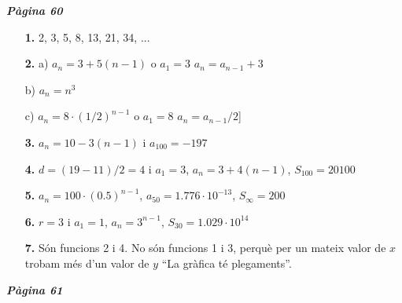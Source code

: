 \documentclass[a4paper, pdf, twoside]{book}
\begin{document}
\begin{multicols}{2}

{\textbf{\em Pàgina 60}} \hrulefill
\begin{enumerate}
\vspace{0.25cm}
\item[\fontfamily{phv}\selectfont\color{blue}\textbf{1. }]  \scalebox{0.6}{\simbolclau } 
2, 3, 5, 8, 13, 21, 34, ...
 \end{enumerate}
\begin{enumerate}
\vspace{0.25cm}
\item[\fontfamily{phv}\selectfont\color{blue}\textbf{2. }]  \scalebox{0.6}{\simbolclau } 
a) $a_n=3+5(n-1)$ o $a_1=3$ $a_n=a_{n-1}+3$ \par b) $a_n=n^3$ \par c) $a_n=8\cdot (1/2)^{n-1}$ o $a_1=8$ $a_n=a_{n-1}/2$]
\vspace{0.25cm}
\item[\fontfamily{phv}\selectfont\color{blue}\textbf{3. }]  \scalebox{0.6}{\simbolclau } 
$a_n=10-3(n-1)$ i $a_{100}=-197$
\vspace{0.25cm}
\item[\fontfamily{phv}\selectfont\color{blue}\textbf{4. }]  \scalebox{0.6}{\simbolclau } 
$d=(19-11)/2=4$ i $a_1=3$, \linebreak $a_n=3+4(n-1)$, $S_{100}=20100$
\vspace{0.25cm}
\item[\fontfamily{phv}\selectfont\color{blue}\textbf{5. }]  \scalebox{0.6}{\simbolclau } 
$a_n=100\cdot (0.5)^{n-1}$, $a_{50}=1.776\cdot 10^{-13}$, $S_\infty =200$
\vspace{0.25cm}
\item[\fontfamily{phv}\selectfont\color{blue}\textbf{6. }]  \scalebox{0.6}{\simbolclau } 
$r=3$ i $a_1=1$, $a_n=3^{n-1}$, $S_{30}=1.029\cdot 10^{14}$
\vspace{0.25cm}
\item[\fontfamily{phv}\selectfont\color{blue}\textbf{7. }] 
Són funcions 2 i 4. No són funcions 1 i 3, perquè per un mateix valor de $x$ trobam més d'un valor de $y$ ``La gràfica té plegaments''.
 \end{enumerate}
\vspace{0.3cm}


{\textbf{\em Pàgina 61}} \hrulefill
\begin{enumerate}
\vspace{0.25cm}



\end{enumerate}
\end{multicols}
\end{document}
